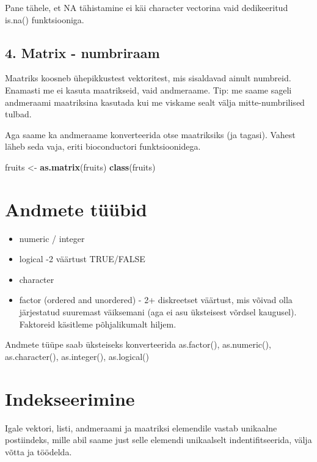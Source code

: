 \documentclass[]{book}
\newenvironment{Shaded}{\begin{snugshade}}{\end{snugshade}}
\newcommand{\KeywordTok}[1]{\textcolor[rgb]{0.13,0.29,0.53}{\textbf{#1}}}
\newcommand{\StringTok}[1]{\textcolor[rgb]{0.31,0.60,0.02}{#1}}
\newcommand{\NormalTok}[1]{#1}
\providecommand{\tightlist}{%
  \setlength{\itemsep}{0pt}\setlength{\parskip}{0pt}}
\begin{document}
Pane tähele, et NA tähistamine ei käi character vectorina vaid
dedikeeritud is.na() funktsiooniga.

\subsection{4. Matrix - numbriraam}\label{matrix---numbriraam}

Maatriks koosneb ühepikkustest vektoritest, mis sisaldavad ainult
numbreid. Enamasti me ei kasuta maatrikseid, vaid andmeraame. Tip: me
saame sageli andmeraami maatriksina kasutada kui me viskame sealt välja
mitte-numbrilised tulbad.

Aga saame ka andmeraame konverteerida otse maatriksiks (ja tagasi).
Vahest läheb seda vaja, eriti bioconductori funktsioonidega.

\begin{Shaded}
\begin{Highlighting}[]
\NormalTok{fruits <-}\StringTok{ }\KeywordTok{as.matrix}\NormalTok{(fruits)}
\KeywordTok{class}\NormalTok{(fruits)}
\end{Highlighting}
\end{Shaded}

\section{Andmete tüübid}\label{andmete-tuubid}

\begin{itemize}
\tightlist
\item
  numeric / integer
\item
  logical -2 väärtust TRUE/FALSE
\item
  character
\item
  factor (ordered and unordered) - 2+ diskreetset väärtust, mis võivad
  olla järjestatud suuremast väiksemani (aga ei asu üksteisest võrdsel
  kaugusel). Faktoreid käsitleme põhjalikumalt hiljem.
\end{itemize}

Andmete tüüpe saab üksteiseks konverteerida as.factor(), as.numeric(),
as.character(), as.integer(), as.logical()

\section{Indekseerimine}\label{indekseerimine}

Igale vektori, listi, andmeraami ja maatriksi elemendile vastab
unikaalne postiindeks, mille abil saame just selle elemendi unikaalselt
indentifitseerida, välja võtta ja töödelda.
\end{document}
